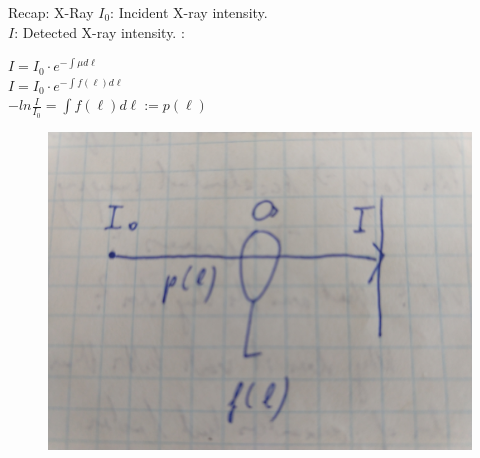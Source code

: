   \begin{frame}{Recap: X-Ray}
    $I_0$: Incident X-ray intensity. \\
    $I$: Detected X-ray intensity.
    \vskip12pt
    :\\
    \begin{center}
     \vskip6pt
        $I=I_0\cdot e^{-\int \mu d\ell}$\\
        \vskip6pt
        $I=I_0\cdot e^{-\int f(\ell) d\ell}$\\
        \vskip6pt
        $-ln \frac{I}{I_0} = \int f(\ell) d\ell := p(\ell)$
    \end{center}

	\begin{figure}[tbp]
		\centering
		\includegraphics[height=0.3\textheight]{images/x_ray_sketch}
		\label{fig:x_ray_sketch}
	\end{figure}	
 \end{frame}

